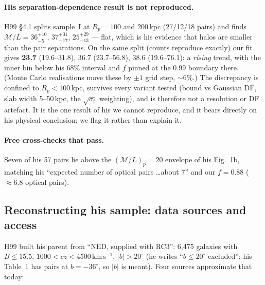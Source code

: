 \documentclass[11pt]{article}
\newcommand{\ML}{\ensuremath{\mathcal{M}/L}}
\begin{document}
\paragraph{His separation-dependence result is not reproduced.} H99 \S4.1
splits sample~I at $R_p = 100$ and 200\,kpc (27/12/18 pairs) and finds
$\ML = 36^{+10}_{-5}$, $37^{+31}_{-17}$, $25^{+29}_{-13}$ --- flat, which is
his evidence that halos are smaller than the pair separations. On the same
split (counts reproduce exactly) our fit gives \textbf{23.7} (19.6--31.8),
36.7 (23.7--56.8), 38.6 (19.6--76.1): a \emph{rising} trend, with the inner
bin below his 68\% interval and $f$ pinned at the 0.99 boundary there.
(Monte Carlo realisations move these by $\pm1$ grid step, $\sim$6\%.) The
discrepancy is confined to $R_p < 100$\,kpc, survives every variant tested
(bound vs Gaussian DF, slab width 5--50\,kpc, the $\sqrt{\sigma_i}$
weighting), and is therefore not a resolution or DF artefact. It is the one
result of his we cannot reproduce, and it bears directly on his physical
conclusion; we flag it rather than explain it.

\paragraph{Free cross-checks that pass.} Seven of his 57 pairs lie above the
$(\ML)_p = 20$ envelope of his Fig.~1b, matching his ``expected number of
optical pairs \ldots about 7'' and our $f = 0.88$ ($\approx 6.8$ optical
pairs).

\subsection{Reconstructing his sample: data sources and access}
\label{sec:h99sources}

H99 built his parent from ``NED, supplied with RC3'': 6,475 galaxies with
$B \le 15.5$, $1000 < cz < 4500$\,km\,s$^{-1}$, $|b| > 20^\circ$ (he writes
``$b \le 20^\circ$ excluded''; his Table~1 has pairs at $b = -36^\circ$, so
$|b|$ is meant). Four sources approximate that today:
\end{document}
